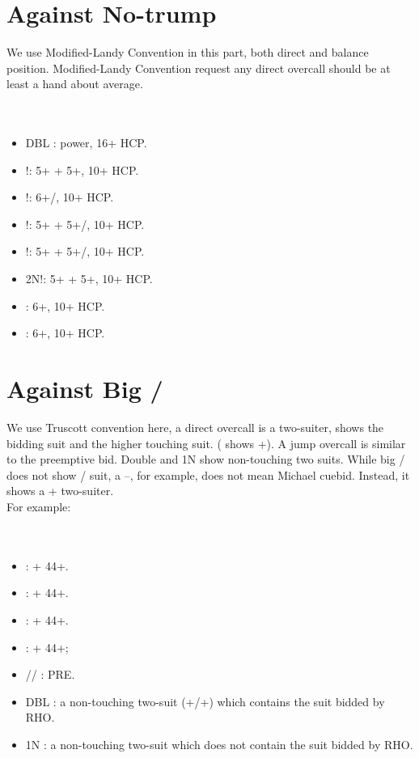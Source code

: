 \documentclass[12pt,twoside,a5paper]{report}%
\begin{document}
\chapter*{Against No-trump}
		We use Modified-Landy Convention in this part, both direct and balance position. Modified-Landy Convention request any direct overcall should be at least a hand about average.\\
		\\
		\\
		\begin{itemize}
		\renewcommand{\labelitemi}{--}
			\item DBL : power, 16+ HCP.
			\item {}!: 5+\sp{} + 5+\he{}, 10+ HCP.
			\item {}!: 6+\sp{}/\he{}, 10+ HCP.
			\item {}!: 5+\he{} + 5+\cl{}/\di{}, 10+ HCP.
			\item {}!: 5+\sp{} + 5+\cl{}/\di{}, 10+ HCP.
			\item 2N!: 5+\cl{} + 5+\di{}, 10+ HCP.
			\item {} : 6+\cl{}, 10+ HCP.
			\item {} : 6+\di{}, 10+ HCP.
		\end{itemize}
\chapter*{Against Big \cl{}/\di{}}
	We use Truscott convention here, a direct overcall is a two-suiter, shows the bidding suit and the higher touching suit. ( shows \sp{}+\cl{}). A jump overcall is similar to the preemptive bid. Double and 1N show non-touching two suits. While big \cl{}/\di{} does not show \cl{}/\di{} suit, a --, for example, does not mean Michael cuebid. Instead, it shows a \cl{}+\di{} two-suiter.\\
	For example:\\
	\\
	\\
	\begin{itemize}
	\renewcommand{\labelitemi}{--}
		\item {} : \di{}+\he{} 44+.
		\item {} : \he{}+\sp{} 44+.
		\item {} : \sp{}+\cl{} 44+.
		\item {} : \cl{}+\di{} 44+;
		\item {}/\he{}/\sp{} : PRE.
		\item DBL : a non-touching two-suit (\he{}+\cl{}/\sp{}+\di{}) which contains the suit bidded by RHO.
		\item 1N : a non-touching two-suit which does not contain the suit bidded by RHO.
	\end{itemize}
\end{document}
